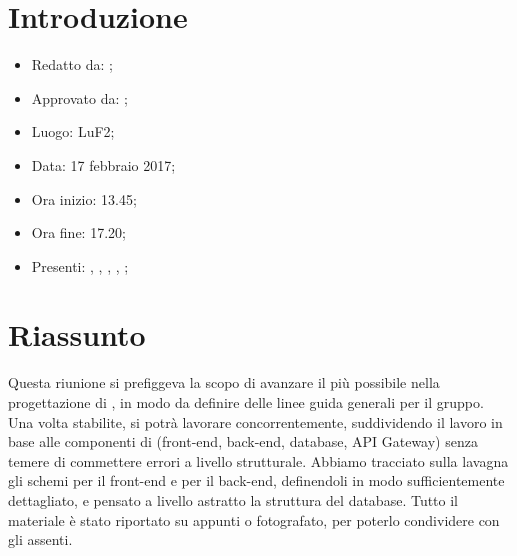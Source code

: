 \section{Introduzione}

	\begin{itemize}
		\item Redatto da: \MC;
		\item Approvato da: \AS;
		\item Luogo: LuF2;
		\item Data: 17 febbraio 2017;
		\item Ora inizio: 13.45;
		\item Ora fine: 17.20;
		\item Presenti: \AN, \DAN, \DS, \MC, \NS;		
	\end{itemize}

\section{Riassunto}
Questa riunione si prefiggeva la scopo di avanzare il più possibile nella progettazione di \progetto, in modo da definire delle linee guida generali per il gruppo. Una volta stabilite, si potrà lavorare concorrentemente, suddividendo il lavoro in base alle componenti di \progetto (front-end, back-end, database, API Gateway) senza temere di commettere errori a livello strutturale.
Abbiamo tracciato sulla lavagna gli schemi per il front-end e per il back-end, definendoli in modo sufficientemente dettagliato, e pensato a livello astratto la struttura del database.
Tutto il materiale è stato riportato su appunti o fotografato, per poterlo condividere con gli assenti.